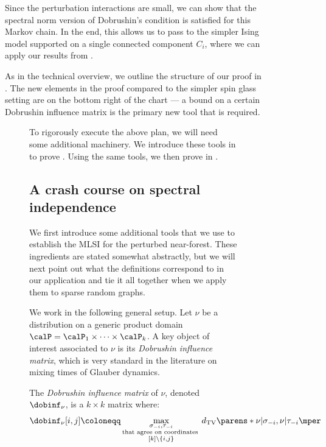 \documentclass[11pt,letterpaper]{article}
\begin{document}
\begin{figure}
Since the perturbation interactions are small, we can show that the spectral norm version of Dobrushin's condition \cite{Hay06} is satisfied for this Markov chain.
In the end, this allows us to pass to the simpler Ising model supported on a single connected component $C_i$, where we can apply our results from .

As in the technical overview, we outline the structure of our proof in . The new elements in the proof compared to the simpler spin glass setting are on the bottom right of the chart --- a bound on a certain Dobrushin influence matrix is the primary new tool that is required.

\begin{figure}

To rigorously execute the above plan, we will need some additional machinery.
We introduce these tools in  to prove . 
Using the same tools, we then prove  in .

\subsection{A crash course on spectral independence}

We first introduce some additional tools that we use to establish the MLSI for the perturbed near-forest. 
These ingredients are stated somewhat abstractly, but we will next point out what the definitions correspond to in our application and tie it all together when we apply them to sparse random graphs.

We work in the following general setup.
Let $\nu$ be a distribution on a generic product domain $\calP = \calP_1\times\dots\times\calP_k$.
A key object of interest associated to $\nu$ is its \emph{Dobrushin influence matrix}, which is very standard in the literature on mixing times of Glauber dynamics.
\begin{definition}
    The \emph{Dobrushin influence matrix} of $\nu$, denoted $\dobinf_{\nu}$, is a $k\times k$ matrix where:
    \[
        \dobinf_{\nu}[i,j] \coloneqq \max_{\substack{\sigma_{-i}, \tau_{-i} \\ \text{that agree on coordinates }\\ [k]\setminus \{i,j\} }} d_{\mathrm{TV}}\parens*{ \nu|\sigma_{-i}, \nu|\tau_{-i} }\mper
    \]
\end{definition}



\end{figure}
\end{figure}
\end{document}
